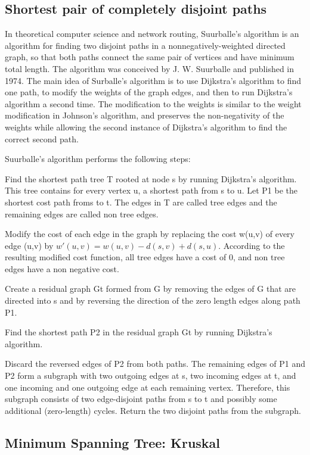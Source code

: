 \documentclass[10pt,letterpaper,twocolumn,twosided]{article}
\begin{document}
\subsection{Shortest pair of completely disjoint paths}

In theoretical computer science and network routing, Suurballe's algorithm is an algorithm for finding two
disjoint paths in a nonnegatively-weighted directed graph, so that both paths connect the same pair of vertices
and have minimum total length. The algorithm was conceived by J. W. Suurballe and published in 1974. The main idea
of Surballe's algorithm is to use Dijkstra's algorithm to find one path, to modify the weights of the graph edges,
and then to run Dijkstra's algorithm a second time. The modification to the weights is similar to the weight 
modification in Johnson's algorithm, and preserves the non-negativity of the weights while allowing the second
instance of Dijkstra's algorithm to find the correct second path.

Suurballe's algorithm performs the following steps:

Find the shortest path tree T rooted at node s by running Dijkstra's algorithm. This tree contains for every vertex u,
a shortest path from s to u. Let P1 be the shortest cost path froms to t. The edges in T are called tree edges
and the remaining edges are called non tree edges.

Modify the cost of each edge in the graph by replacing the cost w(u,v) of every edge (u,v) 
by $w'(u,v) = w(u,v) - d(s,v) + d(s,u).$ According to the resulting modified cost function, all tree edges have a
cost of 0, and non tree edges have a non negative cost.

Create a residual graph Gt formed from G by removing the edges of G that are directed into s and by reversing 
the direction of the zero length edges along path P1.

Find the shortest path P2 in the residual graph Gt by running Dijkstra's algorithm.

Discard the reversed edges of P2 from both paths. The remaining edges of P1 and P2 form a subgraph with two 
outgoing edges at s, two incoming edges at t, and one incoming and one outgoing edge at each remaining vertex.
Therefore, this subgraph consists of two edge-disjoint paths from s to t and possibly some additional (zero-length)
cycles. Return the two disjoint paths from the subgraph.

\subsection{Minimum Spanning Tree: Kruskal}
\end{document}
